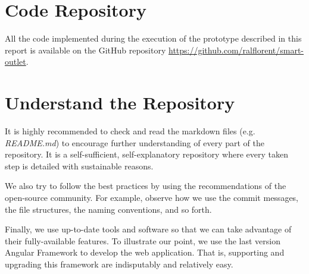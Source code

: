 %
%
%
%


\clearpage
\appendix
\begin{appendices}
    \section{Code Repository}
    \label{sec:code-repo}

    All the code implemented during the execution of the prototype described in this report is available on the GitHub repository \href{https://github.com/ralflorent/smart-outlet}{https://github.com/ralflorent/smart-outlet}.

    \section{Understand the Repository}
    It is highly recommended to check and read the markdown files (e.g. \emph{README.md}) to encourage further understanding of every part of the repository. It is a self-sufficient, self-explanatory repository where every taken step is detailed with sustainable reasons.

    We also try to follow the best practices by using the recommendations of the open-source community. For example, observe how we use the commit messages, the file structures, the naming conventions, and so forth.

    Finally, we use up-to-date tools and software so that we can take advantage of their fully-available features. To illustrate our point, we use the last version Angular Framework to develop the web application. That is, supporting and upgrading this framework are indisputably and relatively easy.

\end{appendices}
